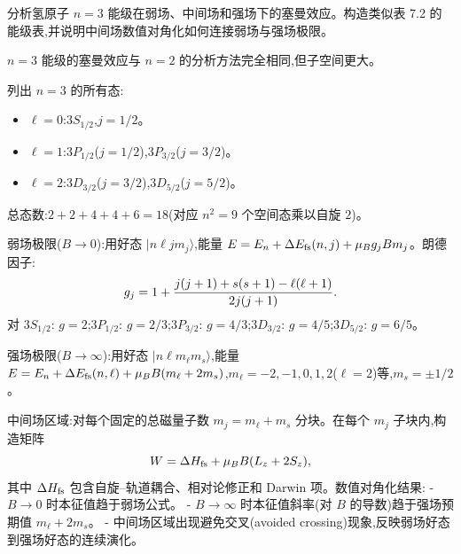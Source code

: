\begin{question}
分析氢原子 $n=3$ 能级在弱场、中间场和强场下的塞曼效应。构造类似表 7.2 的能级表,并说明中间场数值对角化如何连接弱场与强场极限。
\begin{solution}
$n=3$ 能级的塞曼效应与 $n=2$ 的分析方法完全相同,但子空间更大。

列出 $n=3$ 的所有态:
\begin{itemize}
\item $\ell=0$:$3S_{1/2}$,$j=1/2$。
\item $\ell=1$:$3P_{1/2}$($j=1/2$),$3P_{3/2}$($j=3/2$)。
\item $\ell=2$:$3D_{3/2}$($j=3/2$),$3D_{5/2}$($j=5/2$)。
\end{itemize}
总态数:$2+2+4+4+6=18$(对应 $n^2=9$ 个空间态乘以自旋 $2$)。

弱场极限($B\to0$):用好态 $|n\ell j m_j\rangle$,能量 $E=E_n+\Delta E_{\rm fs}(n,j)+\mu_B g_j B m_j$。朗德因子:
\[
g_j=1+{j(j+1)+s(s+1)-\ell(\ell+1)\over2j(j+1)}.
\]
对 $3S_{1/2}$: $g=2$;$3P_{1/2}$: $g=2/3$;$3P_{3/2}$: $g=4/3$;$3D_{3/2}$: $g=4/5$;$3D_{5/2}$: $g=6/5$。

强场极限($B\to\infty$):用好态 $|n\ell m_\ell m_s\rangle$,能量 $E=E_n+\Delta E_{\rm fs}(n,\ell)+\mu_B B(m_\ell+2m_s)$,$m_\ell=-2,-1,0,1,2$($\ell=2$)等,$m_s=\pm1/2$。

中间场区域:对每个固定的总磁量子数 $m_j=m_\ell+m_s$ 分块。在每个 $m_j$ 子块内,构造矩阵
\[
W = \Delta H_{\rm fs} + \mu_B B(L_z+2S_z),
\]
其中 $\Delta H_{\rm fs}$ 包含自旋--轨道耦合、相对论修正和 Darwin 项。数值对角化结果:
- $B\to0$ 时本征值趋于弱场公式。
- $B\to\infty$ 时本征值斜率(对 $B$ 的导数)趋于强场预期值 $m_\ell+2m_s$。
- 中间场区域出现避免交叉(avoided crossing)现象,反映弱场好态到强场好态的连续演化。
\end{solution}
\end{question}

